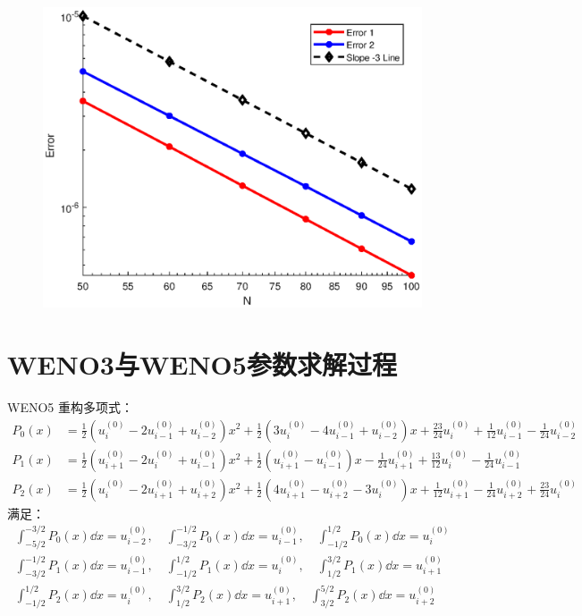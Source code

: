 \documentclass{book}
\begin{document}

\begin{figure}[htp]
    \centering
    \label{fig:}
    \includegraphics[width=0.7\linewidth]{模板/精度/untitled.eps}
    \caption{}
\end{figure}

\section{WENO3与WENO5参数求解过程}
WENO5 重构多项式：
\begin{equation}
    \begin{aligned}
        P_0(x) & = \frac{1}{2} \left(u_{i}^{(0)} - 2 u_{i-1}^{(0)} + u_{i-2}^{(0)}\right)x^2 + \frac{1}{2} \left(3  u_{i}^{(0)} - 4 u_{i-1}^{(0)} + u_{i-2}^{(0)}\right)  x + \frac{23}{24}u_{i}^{(0)} +\frac{1}{12} u_{i-1}^{(0)} -\frac{1}{24} u_{i-2}^{(0)}        \\
        P_1(x) & = \frac{1}{2} \left(u_{i+1}^{(0)} - 2  u_{i}^{(0)} + u_{i-1}^{(0)}\right)x^2 + \frac{1}{2}  \left(u_{i+1}^{(0)} - u_{i-1}^{(0)}\right)  x -\frac{1}{24}  u_{i+1}^{(0)} + \frac{13}{12}  u_{i}^{(0)} -\frac{1}{24}  u_{i-1}^{(0)}                     \\
        P_2(x) & = \frac{1}{2}  \left(u_{i}^{(0)} - 2  u_{i+1}^{(0)} + u_{i+2}^{(0)}\right)x^2 + \frac{1}{2}\left(4  u_{i+1}^{(0)} - u_{i+2}^{(0)} - 3  u_{i}^{(0)}\right)  x + \frac{1}{12}  u_{i+1}^{(0)} -\frac{1}{24}  u_{i+2}^{(0)} + \frac{23}{24}  u_{i}^{(0)}
    \end{aligned}
\end{equation}
满足：
\begin{equation}
    \begin{aligned}
        \int_{-5/2}^{-3/2} P_0(x)\dd x = u_{i-2}^{(0)},\quad \int_{-3/2}^{-1/2} P_0(x)\dd x = u_{i-1}^{(0)},\quad \int_{-1/2}^{1/2} P_0(x)\dd x = u_{i}^{(0)} \\
        \int_{-3/2}^{-1/2} P_1(x)\dd x = u_{i-1}^{(0)},\quad \int_{-1/2}^{1/2} P_1(x)\dd x = u_{i}^{(0)},\quad \int_{1/2}^{3/2} P_1(x)\dd x = u_{i+1}^{(0)}   \\
        \int_{-1/2}^{1/2} P_2(x)\dd x = u_{i}^{(0)},\quad \int_{1/2}^{3/2} P_2(x)\dd x = u_{i+1}^{(0)},\quad \int_{3/2}^{5/2} P_2(x)\dd x = u_{i+2}^{(0)}     \\
    \end{aligned}
\end{equation}
\end{document}

